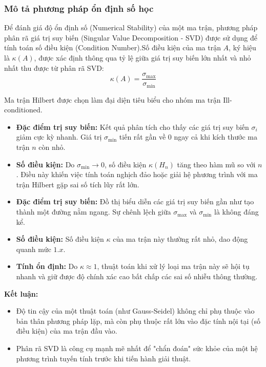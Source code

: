 \documentclass[a4paper]{article}
\begin{document}
\subsubsection{Mô tả phương pháp ổn định số học}

Để đánh giá độ ổn định số (Numerical Stability) của một ma trận, phương pháp phân rã giá trị suy biến (Singular Value Decomposition - SVD) được sử dụng để tính toán số điều kiện (Condition Number).Số điều kiện của ma trận $A$, ký hiệu là $\kappa(A)$, được xác định thông qua tỷ lệ giữa giá trị suy biến lớn nhất và nhỏ nhất thu được từ phân rã SVD:\begin{equation}\kappa(A) = \frac{\sigma_{\max}}{\sigma_{\min}}\end{equation}

Ma trận Hilbert được chọn làm đại diện tiêu biểu cho nhóm ma trận Ill-conditioned.\begin{itemize}\item \textbf{Đặc điểm trị suy biến:} Kết quả phân tích cho thấy các giá trị suy biến $\sigma_i$ giảm cực kỳ nhanh. Giá trị $\sigma_{\min}$ tiến rất gần về 0 ngay cả khi kích thước ma trận $n$ còn nhỏ.\item \textbf{Số điều kiện:} Do $\sigma_{\min} \to 0$, số điều kiện $\kappa(H_n)$ tăng theo hàm mũ so với $n$. Điều này khiến việc tính toán nghịch đảo hoặc giải hệ phương trình với ma trận Hilbert gặp sai số tích lũy rất lớn.\end{itemize}

\begin{itemize}
\item \textbf{Đặc điểm trị suy biến:} Đồ thị biểu diễn các giá trị suy biến gần như tạo thành một đường nằm ngang. Sự chênh lệch giữa $\sigma_{\max}$ và $\sigma_{\min}$ là không đáng kể.
\item \textbf{Số điều kiện:} Số điều kiện $\kappa$ của ma trận này thường rất nhỏ, dao động quanh mức $1.x$.
\item \textbf{Tính ổn định:} Do $\kappa \approx 1$, thuật toán khi xử lý loại ma trận này sẽ hội tụ nhanh và giữ được độ chính xác cao bất chấp các sai số nhiễu thông thường.
\end{itemize}

\textbf{Kết luận:}

\begin{itemize}
\item Độ tin cậy của một thuật toán (như Gauss-Seidel) không chỉ phụ thuộc vào bản thân phương pháp lặp, mà còn phụ thuộc rất lớn vào đặc tính nội tại (số điều kiện) của ma trận đầu vào.
\item Phân rã SVD là công cụ mạnh mẽ nhất để "chẩn đoán" sức khỏe của một hệ phương trình tuyến tính trước khi tiến hành giải thuật.
\end{itemize}
\end{document}
